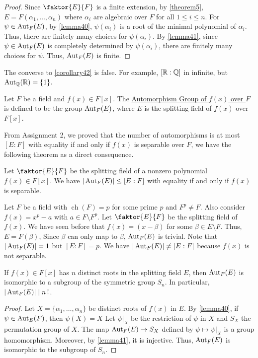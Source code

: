 \documentclass[11pt]{article}
\newcommand{\quotient}[2]{\faktor{#1}{#2}}
\DeclareMathOperator{\ch}{ch}
\begin{document}
\begin{proof}
Since $\quotient{E}{F}$ is a finite extension, by \cref{theorem5}, $E =
F(\alpha_1, \dots, \alpha_n)$ where $\alpha_i$ are algebraic over $F$ for all
$1 \leq i \leq n$. For $\psi \in \operatorname{Aut}_F(E)$, by \cref{lemma40}, $\psi(\alpha_i)$
is a root of the minimal polynomial of $\alpha_i$. Thus, there are finitely many
choices for $\psi(\alpha_i)$. By \cref{lemma41}, since $\psi \in \operatorname{Aut}_F(E)$ is
completely determined by $\psi(\alpha_i)$, there are finitely many choices for
$\psi$. Thus, $\operatorname{Aut}_F(E)$ is finite.
\end{proof}
\begin{remark}
The converse to \cref{corollary42} is false. For example, $[\mathbb{R}:\mathbb{Q}]$ in infinite,
but $\operatorname{Aut}_{\mathbb{Q}}(\mathbb{R}) = \{1\}$.
\end{remark}
\begin{definition}
Let $F$ be a field and $f(x) \in F[x]$. The \underline{Automorphism Group of
$f(x)$ over $F$} is defined to be the group $\operatorname{Aut}_F(E)$, where $E$ is the
splitting field of $f(x)$ over $F[x]$.
\end{definition}
From Assignment 2, we proved that the number of automorphisms is at most $[E:F]$
with equality if and only if $f(x)$ is separable over $F$, we have the following
theorem as a direct consequence.
\begin{theorem}
Let $\quotient{E}{F}$ be the splitting field of a nonzero polynomial $f(x) \in
F[x]$. We have $|\operatorname{Aut}_F(E)| \leq [E:F]$ with equality if and only if $f(x)$ is
separable.
\label{theorem43}
\end{theorem}
\begin{example}
Let $F$ be a field with $\ch(F) = p$ for some prime $p$ and $F^p \neq F$. Also
consider $f(x) = x^p-a$ with $a \in F \setminus F^p$. Let $\quotient{E}{F}$ be
the splitting field of $f(x)$. We have seen before that $f(x) = (x - \beta)$ for
some $\beta \in E \setminus F$. Thus, $E = F(\beta)$, Since $\beta$ can only map
to $\beta$, $\operatorname{Aut}_F(E)$ is trivial. Note that $|\operatorname{Aut}_F(E)| =1$ but $[E:F] = p$.
We have $|\operatorname{Aut}_F(E)| \neq [E:F]$ because $f(x)$ is not separable.
\end{example}
\begin{theorem}
If $f(x) \in F[x]$ has $n$ distinct roots in the splitting field $E$, then
$\operatorname{Aut}_F(E)$ is isomorphic to a subgroup of the symmetric group $S_n$. In
particular, $|\operatorname{Aut}_F(E)| \mid n\operatorname{!}$.
\label{theorem44}
\end{theorem}
\begin{proof}
Let $X = \{\alpha_1, \dots, \alpha_n\}$ be distinct roots of $f(x)$ in $E$. By
\cref{lemma40}, if $\psi \in \operatorname{Aut}_E(F)$, then $\psi(X) = X$ Let $\psi|_X$ be the
restriction of $\psi$ in $X$ and $S_X$ the permutation group of $X$. The map
$\operatorname{Aut}_F(E) \to S_X$ defined by $\psi \mapsto \psi|_X$ is a group homomorphism.
Moreover, by \cref{lemma41}, it is injective. Thus, $\operatorname{Aut}_F(E)$ is isomorphic to
the subgroup of $S_n$.
\end{proof}
\end{document}
